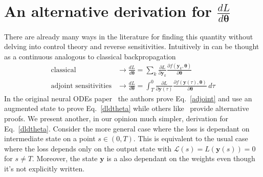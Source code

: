 \documentclass[11pt]{report}
\begin{document}
    \chapter{An alternative derivation for $\frac{dL}{d \pmb{\theta}}$}
    \label{adjoint_proof}
    There are already many ways in the literature for finding this quantity without delving into control theory and reverse sensitivities.
    Intuitively in can be thought as a continuous analogous to classical backpropagation
    \begin{align}
        \text{classical} &\to
        \frac{d L}{ d \pmb{\theta}} =
        \sum_k
        \frac{\partial L}{\partial \pmb{y}_{k}}
        \frac{\partial f(\pmb{y}_k, \pmb\theta)}{\partial \pmb{\theta}}
        \\
        \text{adjoint sensitivities} &\to
        \frac{d L}{ d \pmb{\theta}} =
        \int_T^0
        \frac{\partial L}{\partial \pmb{y}(\tau)}
        \frac{\partial f(\pmb{y}(\tau), \pmb{\theta})}{\partial \pmb{\theta}} \, d\tau
    \end{align}
    In the original neural ODEs paper~\cite{chen2018neural} the authors prove Eq.~\eqref{adjoint} and use an augmented
    state to prove Eq.~\eqref{dldtheta} while others like~\cite{kidger2022neural} provide alternative proofs.
    We present another, in our opinion much simpler, derivation for Eq.~\eqref{dldtheta}.
    Consider the more general case where the loss is dependant on intermediate state on a point $s \in (0,T)$.
    This is equivalent to the usual case where the loss depends only on the output state with $\mathcal{L}(s) = L(\pmb{y}(s))=0$ for $s\neq T$.
    Moreover, the state $\pmb{y}$ is a also dependant on the weights even though it's not explicitly written.
\end{document}
